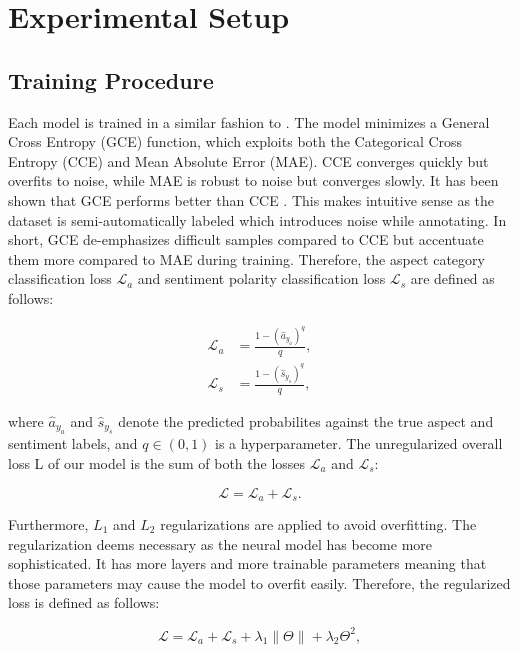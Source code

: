 \documentclass[american, oneside]{ecsgdp}
\begin{document}
\section{Experimental Setup} \label{sec:setup}
\subsection{Training Procedure} \label{sec:training}
Each model is trained in a similar fashion to \textcite{Kumar2021CASC}. The model minimizes a General Cross Entropy (GCE) function, which exploits both the Categorical Cross Entropy (CCE) and Mean Absolute Error (MAE). %
CCE converges quickly but overfits to noise, while MAE is robust to noise but converges slowly. It has been shown that GCE performs better than CCE \parencite{Kumar2021CASC}. This makes intuitive sense as the dataset is semi-automatically labeled which introduces noise while annotating. In short, GCE de-emphasizes difficult samples compared to CCE but accentuate them more compared to MAE during training. Therefore, the aspect category classification loss $\mathcal{L}_a$ and sentiment polarity classification loss $\mathcal{L}_s$ are defined as follows:

\begin{align}
  \mathcal{L}_a & = \frac{1 - \left( \hat{a}_{y_a} \right)^q} {q}, \\
  \mathcal{L}_s & = \frac{1 - \left( \hat{s}_{y_s} \right)^q} {q},
\end{align}

\noindent where $\hat{a}_{y_a}$ and $\hat{s}_{y_s}$ denote the predicted probabilites against the true aspect and sentiment labels, and $q \in (0, 1)$ is a hyperparameter. The unregularized overall loss L of our model is the sum of both the losses $\mathcal{L}_a$ and $\mathcal{L}_s$:

\begin{equation}
    \mathcal{L} = \mathcal{L}_a + \mathcal{L}_s.
\end{equation}

Furthermore, $L_1$ and $L_2$ regularizations are applied to avoid overfitting. The regularization deems necessary as the neural model has become more sophisticated. It has more layers and more trainable parameters meaning that those parameters may cause the model to overfit easily. Therefore, the regularized loss is defined as follows:

\begin{equation}
    \mathcal{L} = \mathcal{L}_a + \mathcal{L}_s + \lambda_1 \|\Theta\| + \lambda_2  \Theta^2,
\end{equation}
\end{document}
